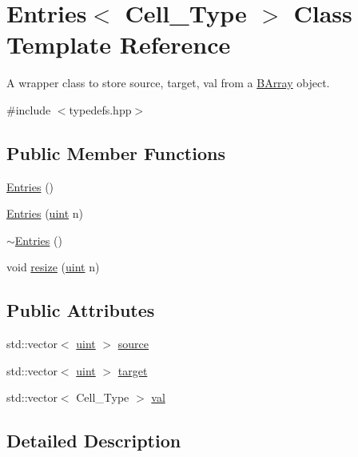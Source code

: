 \hypertarget{class_entries}{}\section{Entries$<$ Cell\+\_\+\+Type $>$ Class Template Reference}
\label{class_entries}


A wrapper class to store {\ttfamily source}, {\ttfamily target}, {\ttfamily val} from a {\ttfamily \hyperlink{class_b_array}{B\+Array}} object.  




{\ttfamily \#include $<$typedefs.\+hpp$>$}

\subsection*{Public Member Functions}
\begin{DoxyCompactItemize}
\item 
\hyperlink{class_entries_a9e6cba5965f285beb3c0356c79f592d2}{Entries} ()
\item 
\hyperlink{class_entries_a03249234a765e3363ae89dba76b3ff9f}{Entries} (\hyperlink{typedefs_8hpp_a91ad9478d81a7aaf2593e8d9c3d06a14}{uint} n)
\item 
\hyperlink{class_entries_aeda42186376731bd3a9b3902a09395a4}{$\sim$\+Entries} ()
\item 
void \hyperlink{class_entries_a8b539e4c53aab5d6ce8305af346b7089}{resize} (\hyperlink{typedefs_8hpp_a91ad9478d81a7aaf2593e8d9c3d06a14}{uint} n)
\end{DoxyCompactItemize}
\subsection*{Public Attributes}
\begin{DoxyCompactItemize}
\item 
std\+::vector$<$ \hyperlink{typedefs_8hpp_a91ad9478d81a7aaf2593e8d9c3d06a14}{uint} $>$ \hyperlink{class_entries_a6a7c589df4cd6ea98386466440dfdc98}{source}
\item 
std\+::vector$<$ \hyperlink{typedefs_8hpp_a91ad9478d81a7aaf2593e8d9c3d06a14}{uint} $>$ \hyperlink{class_entries_a02dad3917fa68044b9ea9c60b2909fd7}{target}
\item 
std\+::vector$<$ Cell\+\_\+\+Type $>$ \hyperlink{class_entries_ae0726e20b17868665cdae6ff70f93bb4}{val}
\end{DoxyCompactItemize}


\subsection{Detailed Description}
